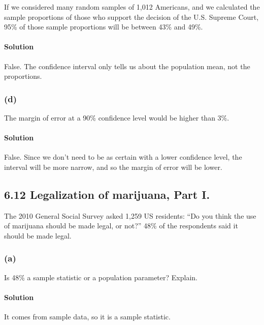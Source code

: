 \documentclass[]{article}
\let\oldparagraph\paragraph
\renewcommand{\paragraph}[1]{\oldparagraph{#1}\mbox{}}
\begin{document}
If we considered many random samples of 1,012 Americans, and we
calculated the sample proportions of those who support the decision of
the U.S. Supreme Court, 95\% of those sample proportions will be between
43\% and 49\%.

\paragraph{Solution}\label{solution-2}

False. The confidence interval only tells us about the population mean,
not the proportions.

\subsubsection{(d)}\label{d}

The margin of error at a 90\% confidence level would be higher than 3\%.

\paragraph{Solution}\label{solution-3}

False. Since we don't need to be as certain with a lower confidence
level, the interval will be more narrow, and so the margin of error will
be lower.

\subsection{6.12 Legalization of marijuana, Part
I.}\label{legalization-of-marijuana-part-i.}

The 2010 General Social Survey asked 1,259 US residents: ``Do you think
the use of marijuana should be made legal, or not?'' 48\% of the
respondents said it should be made legal.

\subsubsection{(a)}\label{a-1}

Is 48\% a sample statistic or a population parameter? Explain.

\paragraph{Solution}\label{solution-4}

It comes from sample data, so it is a sample statistic.
\end{document}
